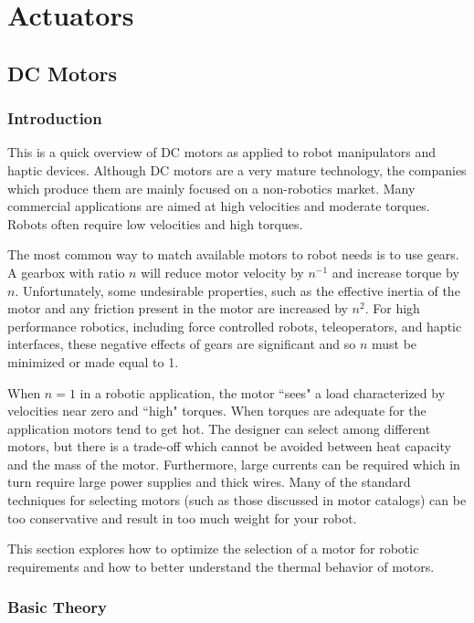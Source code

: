 \section{Actuators}

\subsection{DC Motors}


\subsubsection{Introduction}

This is a quick overview of DC motors as applied to robot manipulators and
haptic devices.
Although DC motors are a very mature technology, the companies which produce
them are mainly focused on a non-robotics market.   Many commercial applications
are aimed at high velocities and moderate torques.  Robots often require low
velocities and high torques.

The most common way to match available motors to robot needs is to use gears.
A gearbox with ratio $n$ will  reduce motor velocity by $n^{-1}$ and
increase torque by $n$.  Unfortunately, some undesirable properties, such
as the effective inertia of the motor and any friction present in the motor
are increased by $n^2$.   For high performance robotics, including force controlled
robots, teleoperators, and haptic interfaces, these negative effects of gears
are significant and so $n$ must be minimized or made equal to 1.

When $n=1$ in a robotic application, the motor ``sees" a load characterized by
velocities near zero and ``high" torques.   When torques are adequate for the
application motors tend to get hot.  The designer can select among different motors,
but there is a trade-off which cannot be avoided between heat capacity and the
mass of the motor.  Furthermore, large currents can be required which in turn
require large power supplies and thick wires.   Many of the standard techniques
for selecting motors (such as those discussed in motor catalogs) can be too
conservative and result in too much weight for your robot.

 This section explores how to optimize the selection of  a motor for
robotic requirements and how to better understand the thermal behavior of
motors.

\subsubsection{Basic Theory}

